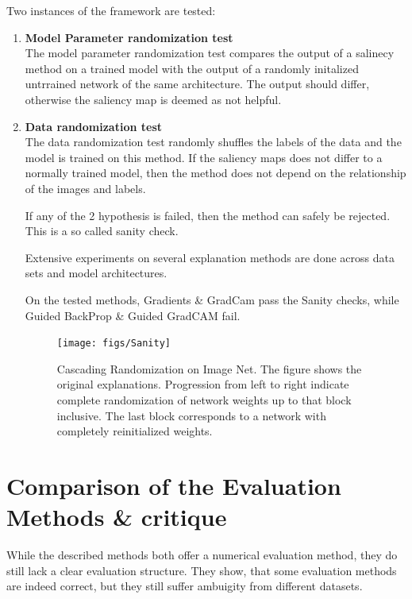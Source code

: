 Two instances of the framework are tested:

\begin{enumerate}
	\item \textbf{Model Parameter randomization test}\\
		The model parameter randomization test compares the output of a salinecy method on a trained model with the output of a randomly initalized untrrained network of the same architecture. The output should differ, otherwise the saliency map is deemed as not helpful.
	\item \textbf{Data randomization test}\\
		The data randomization test randomly shuffles the labels of the data and the model is trained on this method. If the saliency maps does not differ to a normally trained model, then the method does not depend on the relationship of the images and labels.

If any of the 2 hypothesis is failed, then the method can safely be rejected. This is a so called sanity check.

Extensive experiments on several explanation methods are done across data sets and model architectures. 

On the tested methods, Gradients \& GradCam pass the Sanity checks, while Guided BackProp \& Guided GradCAM fail.

\begin{figure}[h!]
	\centering
	\texttt{[image: figs/Sanity]}
	\caption{Cascading Randomization on Image Net. The figure shows the original explanations. Progression from left to right indicate complete randomization of network weights up to that block inclusive. The last block corresponds to a network with completely reinitialized weights.\cite{adebayo2020sanity}}
	\label{fig:Sanity}
\end{figure}


\end{enumerate}

\section{Comparison of the Evaluation Methods \& critique}

While the described methods both offer a numerical evaluation method, they do still lack a clear evaluation structure. They show, that some evaluation methods are indeed correct, but they still suffer ambuigity from different datasets.




